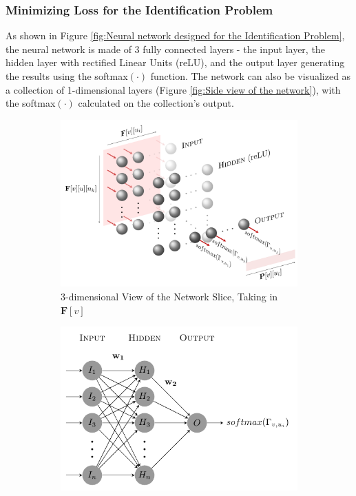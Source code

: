 \documentclass[12pt]{article}
\newcommand{\matr}[1]{\mathbf{#1}}  %
\begin{document}
    \subsubsection{Minimizing Loss for the Identification Problem} \label{sec:Minimizing Loss for the Identification Problem}
    As shown in Figure \ref{fig:Neural network designed for the Identification Problem}, the neural network is made of 3 fully connected layers - the input layer, the hidden layer with rectified Linear Units (reLU), and the output layer generating the results using the softmax$(\cdot)$ function. The network can also be visualized as a collection of 1-dimensional layers (Figure \ref{fig:Side view of the network}), with the softmax$(\cdot)$ calculated on the collection's output.
    \begin{figure}[!htbp]
        \centering
        \begin{subfigure}{\textwidth}
            \centering
            \includegraphics[width=\textwidth]{weights_net}
            \caption{3-dimensional View of the Network Slice, Taking in $\matr{F}[v]$}
            \label{fig:3-dimensional view of the network slice, taking in Fv}
        \end{subfigure}
        \begin{subfigure}{.75\textwidth}
            \centering
            \includegraphics[width=\textwidth]{weights_net_side}

\end{subfigure}
\end{figure}
\end{document}
